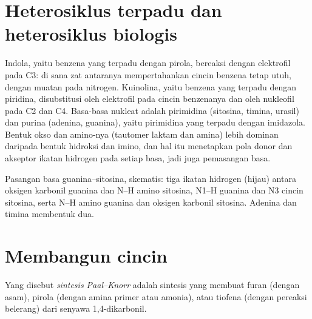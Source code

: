 \section{Heterosiklus terpadu dan heterosiklus biologis}

Indola, yaitu benzena yang terpadu dengan pirola, bereaksi dengan elektrofil pada C3: di sana
zat antaranya mempertahankan cincin benzena tetap utuh, dengan muatan pada nitrogen.
Kuinolina, yaitu benzena yang terpadu dengan piridina, disubstitusi oleh elektrofil pada
cincin benzenanya dan oleh nukleofil pada C2 dan C4. Basa-basa nukleat adalah
pirimidina (sitosina, timina, urasil) dan purina (adenina, guanina), yaitu
pirimidina yang terpadu dengan imidazola. Bentuk okso dan amino-nya (tautomer laktam dan
amina) lebih dominan daripada bentuk hidroksi dan imino, dan hal itu menetapkan pola
donor dan akseptor ikatan hidrogen pada setiap basa, jadi juga pemasangan basa.

\begin{omfigure}

{\small Pasangan basa guanina--sitosina, skematis: tiga ikatan hidrogen (hijau)
antara oksigen karbonil guanina dan N--H amino sitosina, N1--H
guanina dan N3 cincin sitosina, serta N--H amino guanina dan
oksigen karbonil sitosina. Adenina dan timina membentuk dua.}
\end{omfigure}

\section{Membangun cincin}

\begin{definition}\label{def:b3:heterocycles:paal-knorr}
Yang disebut \emph{sintesis Paal--Knorr} adalah sintesis yang membuat furan
(dengan asam), pirola (dengan amina primer atau amonia), atau tiofena (dengan
pereaksi belerang) dari senyawa 1,4-dikarbonil.
\end{definition}

